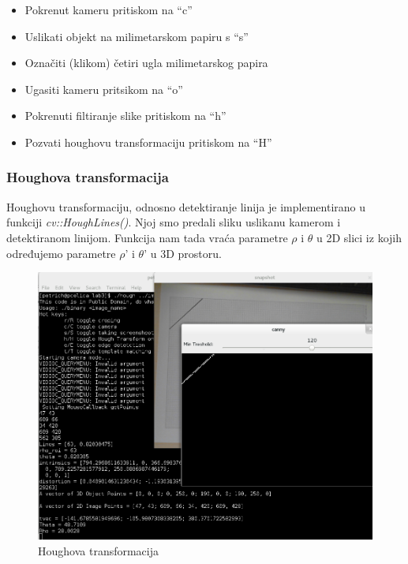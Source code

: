 \begin{itemize}
    \item Pokrenut kameru pritiskom na ``c''
    \item Uslikati objekt na milimetarskom papiru s ``s''
    \item Označiti (klikom) četiri ugla milimetarskog papira
    \item Ugasiti kameru pritsikom na ``o''
    \item Pokrenuti filtiranje slike pritiskom na ``h''
    \item Pozvati houghovu transformaciju pritiskom na ``H''
\end{itemize}


\subsubsection{Houghova transformacija}
Houghovu transformaciju, odnosno detektiranje linija je implementirano u
funkciji \textit{cv::HoughLines()}. Njoj smo predali sliku uslikanu
kamerom i detektiranom linijom. Funkcija nam tada vraća parametre 
\(\rho \) i \( \theta \) u 2D slici iz kojih određujemo parametre 
\(\rho \)' i \( \theta\)' u 3D prostoru.

\begin{figure}[h]
\centering
\includegraphics[scale=0.4]{images/lab3-02-ht.png}
\caption{Houghova transformacija}
\label{fig:lab3-02-ht}
\end{figure}

